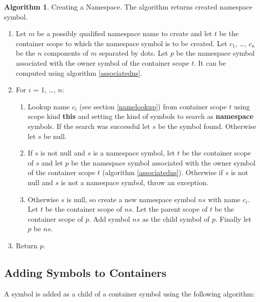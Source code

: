 \documentclass[a4paper,oneside,11pt]{book}
\theoremstyle{definition}
\newtheorem{algo}{Algorithm}[section]
\begin{document}
\begin{algo}\label{createns} Creating a Namespace. The algorithm returns created namespace symbol.
\begin{enumerate}
\item
Let $m$ be a possibly qualified namespace name to create and let $t$ be the container scope to which the namespace symbol is to be created.
Let $c_1$, \ldots, $c_n$ be the $n$ components of $m$ separated by dots.
Let $p$ be the namespace symbol associated with the owner symbol of the container scope $t$.
It can be computed using algorithm \ref{associatedns}.
\item
For $i$ = 1, \ldots, $n$:
\begin{enumerate}
\item
Lookup name $c_i$ (see section \ref{namelookup})
from container scope $t$ using scope kind \textbf{this} and setting the kind of symbols to search as \textbf{namespace} symbols.
If the search was successful let $s$ be the symbol found. Otherwise let $s$ be null.
\item
If $s$ is not null and $s$ is a namespace symbol, let $t$ be the container scope of $s$ and
let $p$ be the namespace symbol associated with the owner symbol of the container scope $t$ (algorithm \ref{associatedns}).
Otherwise if $s$ is not null and $s$ is not a namespace symbol, throw an exception.
\item
Otherwise $s$ is null, so create a new namespace symbol $ns$ with name $c_i$. Let $t$ be the container scope of $ns$.
Let the parent scope of $t$ be the container scope of $p$. Add symbol $ns$ as the child symbol of $p$. Finally let $p$ be $ns$.
\end{enumerate}
\item
Return $p$.
\end{enumerate}
\end{algo}

\subsection{Adding Symbols to Containers}

A symbol is added as a child of a container symbol using the following algorithm:
\end{document}
